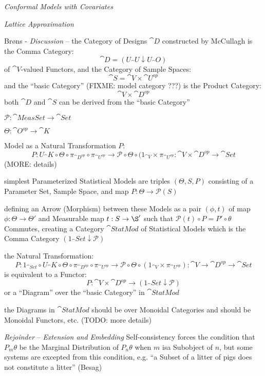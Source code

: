 \emph{Conformal Models with Covariates}

\emph{Lattice Approximation}

Br{\o}ns - \emph{Discussion} -- the Category of Designs $\cat{D}$ constructed by
McCullagh is the Comma Category:
\[
  \cat{D} = (U_\cat{U} \downarrow U_\cat{O})
\]
of $\cat{V}$-valued Functors, and the Category of Sample Spaces:
\[
  \cat{S} = \cat{V} \times \cat{U}^{op}
\]
and the ``basic Category'' (FIXME: model category ???) is the Product Category:
\[
  \cat{V} \times \cat{D}^{op}
\]
both $\cat{D}$ and $\cat{S}$ can be derived from the ``basic Category''

$\mathcal{P} : \cat{MeasSet} \to \cat{Set}$

$\Theta : \cat{O}^{op} \to \cat{K}$

Model as a Natural Transformation $P$:
\[
  P : U_\cat{K} \circ \Theta \circ \pi_{\cat{D}^{op}} \circ \pi_{\cat{U}^{op}}
    \to \mathcal{P} \circ \Theta \circ (1_{\cat{V}} \times \pi_{\cat{U}^{op}}
    : \cat{V} \times \cat{D}^{op} \to \cat{Set}
\]
(MORE: details)

simplest Parameterized Statistical Models are triples $(\Theta, S, P)$
consisting of a Parameter Set, Sample Space, and map
$P : \Theta \to \mathcal{P}(S)$

defining an Arrow (Morphism) between these Models as a pair $(\phi, t)$ of map
$\phi : \Theta \to \Theta'$ and Measurable map $t : S \to \S'$ such that
$\mathcal{P}(t) \circ P = P' \circ \theta$ Commutes, creating a Category
$\cat{StatMod}$ of Statistical Models which is the Comma Category
$(1_\cat{Set} \downarrow \mathcal{P})$

the Natural Transformation:
\[
  P : 1_{\cat{Set}} \circ U_\cat{K} \circ \Theta \circ \pi_{\cat{D}^{op}}
      \circ \pi_{\cat{U}^{op}}
    \to \mathcal{P} \circ \Theta \circ (1_{\cat{V}} \times \pi_{\cat{U}^{op}})
    : \cat{V} \to \cat{D}^{op} \to \cat{Set}
\]
is equivalent to a Functor:
\[
  P : \cat{V} \times \cat{D}^{op} \to (1_\cat{Set} \downarrow \mathcal{P})
\]
or a ``Diagram'' over the ``basic Category'' in $\cat{StatMod}$

the Diagrams in $\cat{StatMod}$ should be over Monoidal Categories and should be
Monoidal Functors, etc. (TODO: more details)

\emph{Rejoinder} -- \emph{Extension and Embedding} Self-consistency forces the
condition that $P_m\theta$ be the Marginal Distribution of $P_n\theta$ when $m$
isa  Subobject of $n$, but some systems are excepted from this condition, e.g.
``a Subset of a litter of pigs does not constitute a litter'' (Besag)



